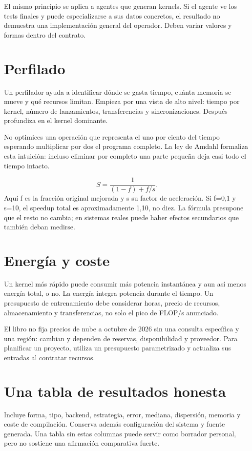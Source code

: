 \documentclass[12pt,a4paper,oneside]{report}
\begin{document}
El mismo principio se aplica a agentes que generan kernels. Si el agente ve los tests finales y puede especializarse a sus datos concretos, el resultado no demuestra una implementación general del operador. Deben variar valores y formas dentro del contrato.

\section{Perfilado}
Un perfilador ayuda a identificar dónde se gasta tiempo, cuánta memoria se mueve y qué recursos limitan. Empieza por una vista de alto nivel: tiempo por kernel, número de lanzamientos, transferencias y sincronizaciones. Después profundiza en el kernel dominante.

No optimices una operación que representa el uno por ciento del tiempo esperando multiplicar por dos el programa completo. La ley de Amdahl formaliza esta intuición: incluso eliminar por completo una parte pequeña deja casi todo el tiempo intacto.

\[
S=\frac{1}{(1-f)+f/s}.
\]
Aquí f es la fracción original mejorada y s su factor de aceleración. Si f=0,1 y s=10, el speedup total es aproximadamente 1,10, no diez. La fórmula presupone que el resto no cambia; en sistemas reales puede haber efectos secundarios que también deban medirse.

\section{Energía y coste}
Un kernel más rápido puede consumir más potencia instantánea y aun así menos energía total, o no. La energía integra potencia durante el tiempo. Un presupuesto de entrenamiento debe considerar horas, precio de recursos, almacenamiento y transferencias, no solo el pico de FLOP/s anunciado.

El libro no fija precios de nube a octubre de 2026 sin una consulta específica y una región: cambian y dependen de reservas, disponibilidad y proveedor. Para planificar un proyecto, utiliza un presupuesto parametrizado y actualiza sus entradas al contratar recursos.

\section{Una tabla de resultados honesta}
Incluye forma, tipo, backend, estrategia, error, mediana, dispersión, memoria y coste de compilación. Conserva además configuración del sistema y fuente generada. Una tabla sin estas columnas puede servir como borrador personal, pero no sostiene una afirmación comparativa fuerte.
\end{document}
